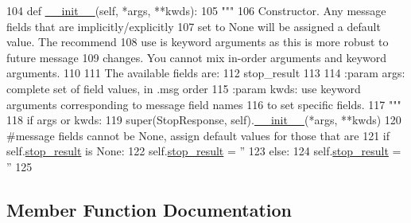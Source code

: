 \begin{DoxyCode}
104   \textcolor{keyword}{def }\hyperlink{classjaco__msgs_1_1srv_1_1__Stop_1_1StopResponse_ac4e2684f8a210a9322df2fa51a6a224e}{\_\_init\_\_}(self, *args, **kwds):
105     \textcolor{stringliteral}{"""}
106 \textcolor{stringliteral}{    Constructor. Any message fields that are implicitly/explicitly}
107 \textcolor{stringliteral}{    set to None will be assigned a default value. The recommend}
108 \textcolor{stringliteral}{    use is keyword arguments as this is more robust to future message}
109 \textcolor{stringliteral}{    changes.  You cannot mix in-order arguments and keyword arguments.}
110 \textcolor{stringliteral}{}
111 \textcolor{stringliteral}{    The available fields are:}
112 \textcolor{stringliteral}{       stop\_result}
113 \textcolor{stringliteral}{}
114 \textcolor{stringliteral}{    :param args: complete set of field values, in .msg order}
115 \textcolor{stringliteral}{    :param kwds: use keyword arguments corresponding to message field names}
116 \textcolor{stringliteral}{    to set specific fields.}
117 \textcolor{stringliteral}{    """}
118     \textcolor{keywordflow}{if} args \textcolor{keywordflow}{or} kwds:
119       super(StopResponse, self).\hyperlink{classjaco__msgs_1_1srv_1_1__Stop_1_1StopResponse_ac4e2684f8a210a9322df2fa51a6a224e}{\_\_init\_\_}(*args, **kwds)
120       \textcolor{comment}{#message fields cannot be None, assign default values for those that are}
121       \textcolor{keywordflow}{if} self.\hyperlink{classjaco__msgs_1_1srv_1_1__Stop_1_1StopResponse_ae2263a254672fbbe4d311a1cc5cf56cc}{stop\_result} \textcolor{keywordflow}{is} \textcolor{keywordtype}{None}:
122         self.\hyperlink{classjaco__msgs_1_1srv_1_1__Stop_1_1StopResponse_ae2263a254672fbbe4d311a1cc5cf56cc}{stop\_result} = \textcolor{stringliteral}{''}
123     \textcolor{keywordflow}{else}:
124       self.\hyperlink{classjaco__msgs_1_1srv_1_1__Stop_1_1StopResponse_ae2263a254672fbbe4d311a1cc5cf56cc}{stop\_result} = \textcolor{stringliteral}{''}
125 
\end{DoxyCode}


\subsection{Member Function Documentation}
